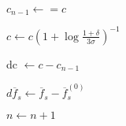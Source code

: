 \begin{algorithm}
{    $c_{n-1} \longleftarrow = c$ \;

    $c \longleftarrow c\left(1 + \log\frac{1 + \delta}{3 \sigma}\right)^{-1}$

    dc $\longleftarrow c - c_{n-1}$ \;

     {
        $d\overline{f}_s \longleftarrow \overline{f}_s - \overline{f}_s^{(0)}$ \;

        \vspace{5pt}

        {
        }
        
        \vspace{5pt}
    }

    $n \longleftarrow n+1 $ \;
    
    }

\end{algorithm}
